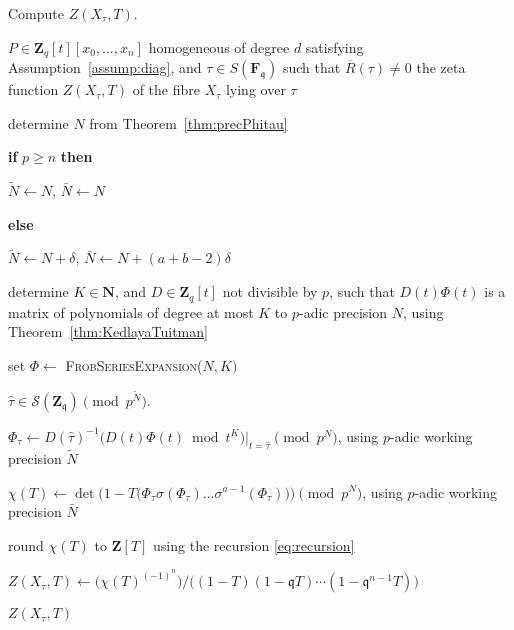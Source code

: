 \documentclass[a4paper,11pt]{article}
\numberwithin{equation}{section}
\newcommand{\NN}{\mathbf{N}} %
\newcommand{\ZZ}{\mathbf{Z}} %
\theoremstyle{definition}
\begin{document}
\begin{algorithm} 
\caption{Compute $Z(X_{\tau},T)$.}
\label{alg:complete}
\begin{algorithmic}
\vspace{1mm}
\Require $P \in \ZZ_q[t][x_0,\ldots,x_n]$ homogeneous of degree $d$ satisfying Assumption~\ref{assump:diag}, and $\tau \in S(\mathbf{F}_{\mathfrak{q}})$ such that $\overline{R}(\tau) \neq 0$
\Ensure  the zeta function $Z(X_{\tau},T)$ of the fibre $X_{\tau}$ lying over $\tau$
\State \begin{compactenum}[{\hspace{1em} } 1.] \vspace{-1.24em}
\item determine $N$ from Theorem~\ref{thm:precPhitau}
\item \textbf{if} $p \geq n$ \textbf{then} 
\item[] \hspace{1em} $\tilde{N} \gets N$, $\bar{N} \gets N$ 
\item[] \textbf{else}
\item[] \hspace{1em} $\tilde{N} \gets N + \delta$, $\bar{N} \gets N+(a+b-2) \delta$
\item determine $K \in \NN$, and $D \in \ZZ_q[t]$ not divisible by $p$, such that $D(t) \Phi(t)$ is a matrix 
      of polynomials of degree at most $K$ to $p$-adic precision $N$, using Theorem~\ref{thm:KedlayaTuitman}
\item set $\Phi \gets$ \textsc{FrobSeriesExpansion($N,K)$}
\item $\hat{\tau} \in \mathcal{S}(\ZZ_{\mathfrak{q}}) \pmod{p^{\tilde{N}}}$.
\item $\Phi_{\tau} \gets D(\hat{\tau})^{-1} \bigl( D(t) \Phi(t) \bmod{t^{K}} \bigr)|_{t=\hat{\tau}} \pmod{p^{N}}$, using $p$-adic working precision $\tilde{N}$
\item $\chi(T) \gets \det\bigl(1-T \bigl(\Phi_{\tau} \sigma(\Phi_{\tau}) \ldots \sigma^{a-1}(\Phi_{\tau}) \bigr)  \bigr) \pmod{p^{N}}$, using $p$-adic working precision $\bar{N}$
\item round $\chi(T)$ to $\ZZ[T]$ using the recursion \eqref{eq:recursion} 
\item $Z(X_{\tau},T) \gets \bigl( \chi(T)^{(-1)^n} \bigr)/\bigl((1 - T) (1 - \mathfrak{q}T) \dotsm (1 - \mathfrak{q}^{n-1}T)\bigr)$
\item \Return $Z(X_{\tau},T)$
\end{compactenum}
\EndProcedure
\end{algorithmic}
\end{algorithm}
\end{document}
